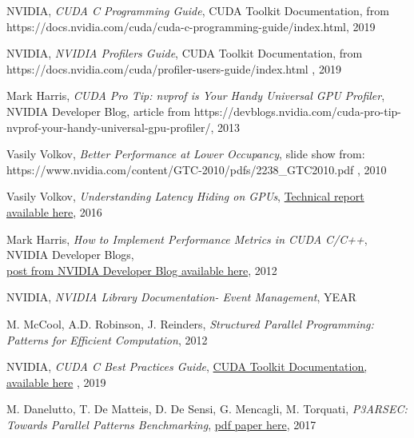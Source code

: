 \documentclass[12pt]{report}
\begin{document}
\begin{thebibliography}{9}
		 
		 
		NVIDIA, \textit{CUDA C Programming Guide}, CUDA Toolkit Documentation, from https://docs.nvidia.com/cuda/cuda-c-programming-guide/index.html, 2019
		
		
		NVIDIA, \textit{NVIDIA Profilers Guide}, CUDA Toolkit Documentation, from
		https://docs.nvidia.com/cuda/profiler-users-guide/index.html , 2019 
		
		
		Mark Harris, 
		\textit{CUDA Pro Tip: nvprof is Your Handy Universal GPU Profiler}, NVIDIA Developer Blog, article from https://devblogs.nvidia.com/cuda-pro-tip-nvprof-your-handy-universal-gpu-profiler/, 2013
		
		Vasily Volkov,
		\textit{Better Performance at Lower Occupancy}, slide show from: https://www.nvidia.com/content/GTC-2010/pdfs/2238\_GTC2010.pdf , 2010
		
		
		Vasily Volkov, \textit{Understanding Latency Hiding on GPUs}, \href{https://www2.eecs.berkeley.edu/Pubs/TechRpts/2016/EECS-2016-143.pdf}{Technical report available here}, 2016
		
		
		Mark Harris, \textit{How to Implement Performance Metrics in CUDA C/C++}, NVIDIA Developer Blogs,  \\
		\href{https://devblogs.nvidia.com/how-implement-performance-metrics-cuda-cc/}{post from NVIDIA Developer Blog available here}, 2012 
		
		NVIDIA, \textit{NVIDIA Library Documentation- Event Management}, YEAR
		
		M. McCool, A.D. Robinson, J. Reinders, \textit{Structured Parallel Programming: Patterns for Efficient Computation}, 2012
		
		NVIDIA, \textit{CUDA C Best Practices Guide}, \href{https://docs.nvidia.com/cuda/cuda-c-best-practices-guide/index.html}{CUDA Toolkit Documentation, available here} , 2019
		
		M. Danelutto, T. De Matteis, D. De Sensi, G. Mencagli, M. Torquati, \textit{P3ARSEC: Towards Parallel Patterns Benchmarking}, \href{http://pages.di.unipi.it/desensi/assets/pdf/2017\_SAC.pdf}{pdf paper here}, 2017
		

\end{thebibliography}
\end{document}

